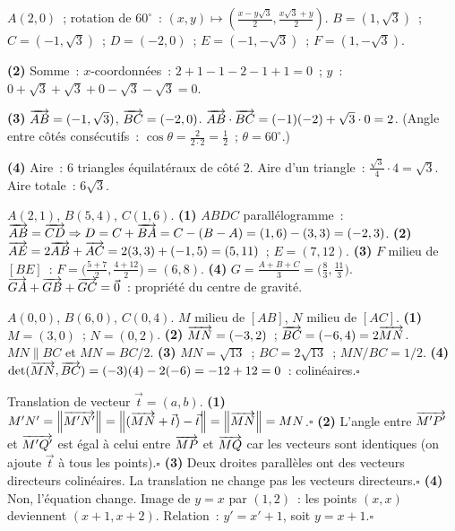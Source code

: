 
$A(2,0)$~; rotation de $60^{\circ}$~: $(x,y)\mapsto(\frac{x-y\sqrt{3}}{2},\frac{x\sqrt{3}+y}{2})$.
$B=(1,\sqrt{3})$~; $C=(-1,\sqrt{3})$~; $D=(-2,0)$~; $E=(-1,-\sqrt{3})$~; $F=(1,-\sqrt{3})$.

\textbf{(2)} Somme~: $x$-coordonn\'ees~: $2+1-1-2-1+1=0$~; $y$~: $0+\sqrt{3}+\sqrt{3}+0-\sqrt{3}-\sqrt{3}=0$.\checkmark

\textbf{(3)} $\overrightarrow{AB}=(-1,\sqrt{3})$, $\overrightarrow{BC}=(-2,0)$.
$\overrightarrow{AB}\cdot\overrightarrow{BC}=(-1)(-2)+\sqrt{3}\cdot0=2$.
(Angle entre c\^ot\'es cons\'ecutifs~: $\cos\theta=\frac{2}{2\cdot2}=\frac{1}{2}$~; $\theta=60^{\circ}$.)

\textbf{(4)} Aire~: 6 triangles \'equilat\'eraux de c\^ot\'e $2$.
Aire d'un triangle~: $\frac{\sqrt{3}}{4}\cdot4=\sqrt{3}$.
Aire totale~: $6\sqrt{3}$.


$A(2,1)$, $B(5,4)$, $C(1,6)$.
\textbf{(1)} $ABDC$ parall\'elogramme~: $\overrightarrow{AB}=\overrightarrow{CD}\Rightarrow D=C+\overrightarrow{BA}=C-(B-A)=(1,6)-(3,3)=(-2,3)$.
\textbf{(2)} $\overrightarrow{AE}=2\overrightarrow{AB}+\overrightarrow{AC}=2(3,3)+(-1,5)=(5,11)$~; $E=(7,12)$.
\textbf{(3)} $F$ milieu de $[BE]$~: $F=\bigl(\frac{5+7}{2},\frac{4+12}{2}\bigr)=(6,8)$.
\textbf{(4)} $G=\frac{A+B+C}{3}=\bigl(\frac{8}{3},\frac{11}{3}\bigr)$.
$\overrightarrow{GA}+\overrightarrow{GB}+\overrightarrow{GC}=\vec{0}$~: propri\'et\'e du centre de gravité.\checkmark


$A(0,0)$, $B(6,0)$, $C(0,4)$. $M$ milieu de $[AB]$, $N$ milieu de $[AC]$.
\textbf{(1)} $M=(3,0)$~; $N=(0,2)$.
\textbf{(2)} $\overrightarrow{MN}=(-3,2)$~; $\overrightarrow{BC}=(-6,4)=2\overrightarrow{MN}$.
$MN\parallel BC$ et $MN=BC/2$.
\textbf{(3)} $MN=\sqrt{13}$~; $BC=2\sqrt{13}$~; $MN/BC=1/2$.
\textbf{(4)} $\det(\overrightarrow{MN},\overrightarrow{BC})=(-3)(4)-2(-6)=-12+12=0$~: colin\'eaires.\checkmark\hfill$\square$


Translation de vecteur $\vec{t}=(a,b)$.
\textbf{(1)} $M'N'=\left\|\overrightarrow{M'N'}\right\|=\left\|(\overrightarrow{MN}+\vec{t})-\vec{t}\right\|=\left\|\overrightarrow{MN}\right\|=MN$.\hfill$\square$
\textbf{(2)} L'angle entre $\overrightarrow{M'P'}$ et $\overrightarrow{M'Q'}$ est \'egal \`a celui entre $\overrightarrow{MP}$ et $\overrightarrow{MQ}$
car les vecteurs sont identiques (on ajoute $\vec{t}$ \`a tous les points).\hfill$\square$
\textbf{(3)} Deux droites parall\`eles ont des vecteurs directeurs colin\'eaires.
La translation ne change pas les vecteurs directeurs.\hfill$\square$
\textbf{(4)} Non, l'\'equation change.
Image de $y=x$ par $(1,2)$~: les points $(x,x)$ deviennent $(x+1,x+2)$.
Relation~: $y'=x'+1$, soit $y=x+1$.\hfill$\square$

